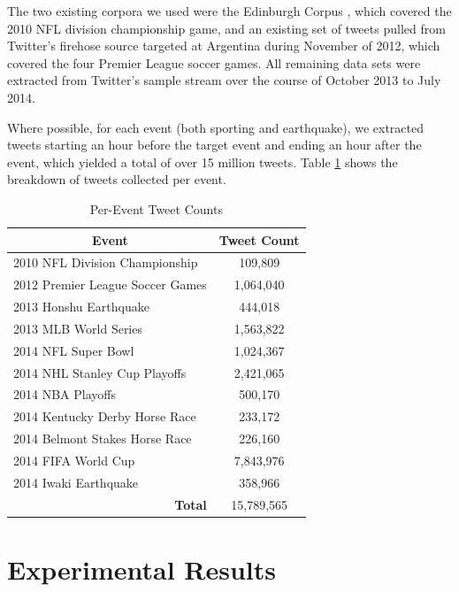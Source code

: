 \documentclass[letterpaper]{article}
\begin{document}
The two existing corpora we used were the Edinburgh Corpus \cite{Petrovic:2010:ETC:1860667.1860680}, which covered the 2010 NFL division championship game, and an existing set of tweets pulled from Twitter's firehose source targeted at Argentina during November of 2012, which covered the four Premier League soccer games.
All remaining data sets were extracted from Twitter's sample stream over the course of October 2013 to July 2014.

Where possible, for each event (both sporting and earthquake), we extracted tweets starting an hour before the target event and ending an hour after the event, which yielded a total of over 15 million tweets.
Table \ref{tab:tweetCounts} shows the breakdown of tweets collected per event.

\begin{table}[htdp]
\caption{Per-Event Tweet Counts}
\begin{center}
\begin{tabular}{|p{2in}|c|}
\hline
\multicolumn{1}{|c|}{\textbf{Event}} & \textbf{Tweet Count} \\ \hline
2010 NFL Division Championship & 109,809 \\ \hline
2012 Premier League Soccer Games & 1,064,040 \\ \hline
2013 Honshu Earthquake  & 444,018 \\ \hline
2013 MLB World Series  & 1,563,822 \\ \hline
2014 NFL Super Bowl & 1,024,367 \\ \hline
2014 NHL Stanley Cup Playoffs & 2,421,065 \\ \hline
2014 NBA Playoffs & 500,170 \\ \hline
2014 Kentucky Derby Horse Race & 233,172 \\ \hline
2014 Belmont Stakes Horse Race & 226,160 \\ \hline
2014 FIFA World Cup & 7,843,976 \\ \hline
2014 Iwaki Earthquake  & 358,966 \\ \hline
\multicolumn{1}{|r|}{\textbf{Total}} &  15,789,565  \\ \hline
\end{tabular}
\end{center}
\label{tab:tweetCounts}
\end{table}

\section{Experimental Results}
\label{sect:results}
\end{document}
